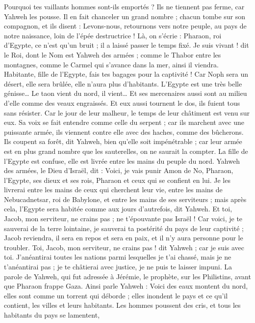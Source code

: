 \begin{multicols}{2}
Pourquoi tes vaillants hommes sont-ils emportés ? Ils ne tiennent pas ferme, car Yahweh les pousse.
Il en fait chanceler un grand nombre ; chacun tombe sur son compagnon, et ils disent : Levons-nous, retournons vers notre peuple, au pays de notre naissance, loin de l'épée destructrice !
Là, on s'écrie : Pharaon, roi d'Egypte, ce n'est qu'un bruit ; il a laissé passer le temps fixé.
Je suis vivant ! dit le Roi, dont le Nom est Yahweh des armées ; comme le Thabor entre les montagnes, comme le Carmel qui s'avance dans la mer, ainsi il viendra.
Habitante, fille de l'Egypte, fais tes bagages pour la captivité ! Car Noph sera un désert, elle sera brûlée, elle n'aura plus d'habitants.
L'Egypte est une très belle génisse… Le taon vient du nord, il vient…
Et ses mercenaires aussi sont au milieu d'elle comme des veaux engraissés. Et eux aussi tournent le dos, ils fuient tous sans résister. Car le jour de leur malheur, le temps de leur châtiment est venu sur eux.
Sa voix se fait entendre comme celle du serpent ; car ils marchent avec une puissante armée, ils viennent contre elle avec des haches, comme des bûcherons.
Ils coupent sa forêt, dit Yahweh, bien qu'elle soit impénétrable ; car leur armée est en plus grand nombre que les sauterelles, on ne saurait la compter.
La fille de l'Egypte est confuse, elle est livrée entre les mains du peuple du nord.
Yahweh des armées, le Dieu d'Israël, dit : Voici, je vais punir Amon de No, Pharaon, l'Egypte, ses dieux et ses rois, Pharaon et ceux qui se confient en lui.
Je les livrerai entre les mains de ceux qui cherchent leur vie, entre les mains de Nebucadnetsar, roi de Babylone, et entre les mains de ses serviteurs ; mais après cela, l'Egypte sera habitée comme aux jours d'autrefois, dit Yahweh.
Et toi, Jacob, mon serviteur, ne crains pas ; ne t'épouvante pas Israël ! Car voici, je te sauverai de la terre lointaine, je sauverai ta postérité du pays de leur captivité ; Jacob reviendra, il sera en repos et sera en paix, et il n'y aura personne pour le troubler.
Toi, Jacob, mon serviteur, ne crains pas ! dit Yahweh ; car je suis avec toi. J'anéantirai toutes les nations parmi lesquelles je t'ai chassé, mais je ne t'anéantirai pas ; je te châtierai avec justice, je ne puis te laisser impuni.
\VerseOne{}La parole de Yahweh, qui fut adressée à Jérémie, le prophète, sur les Philistins, avant que Pharaon frappe Gaza.
Ainsi parle Yahweh : Voici des eaux montent du nord, elles sont comme un torrent qui déborde ; elles inondent le pays et ce qu'il contient, les villes et leurs habitants. Les hommes poussent des cris, et tous les habitants du pays se lamentent,

\end{multicols}
